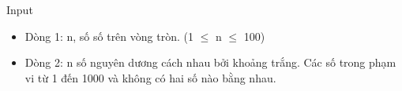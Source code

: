 Input
\begin{itemize}
	\item     Dòng 1: n, số số trên vòng tròn. (1 $\le$ n $\le$ 100)   
	\item     Dòng 2: n số nguyên dương cách nhau bởi khoảng trắng. Các số trong phạm vi từ 1 đến 1000 và không có hai số nào bằng nhau.   
\end{itemize}